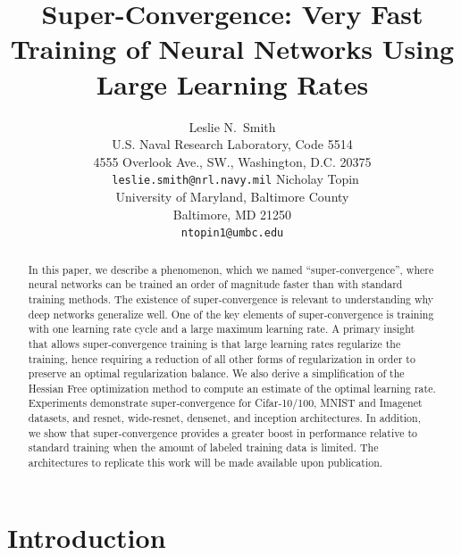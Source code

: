 \documentclass{article}
\title{Super-Convergence: Very Fast Training of Neural Networks Using Large Learning Rates}
\author{Leslie N.~Smith \\
	U.S. Naval Research Laboratory, Code 5514\\
	4555 Overlook Ave., SW., Washington, D.C.  20375\\
	\texttt{ leslie.smith@nrl.navy.mil}
	\And
	Nicholay Topin \\
	University of Maryland, Baltimore County \\
	Baltimore, MD 21250 \\
	\texttt{ntopin1@umbc.edu} \\
}
\begin{document}

\maketitle

\begin{abstract}
In this paper, we describe a phenomenon, which we named ``super-convergence'', where neural networks can be trained  an order of magnitude faster than with standard training methods. 
The existence of super-convergence is relevant to understanding why deep networks generalize well.
One of the key elements of super-convergence is training with one learning rate cycle and a large maximum learning rate.
A primary insight that allows super-convergence training is that large learning rates regularize the training, hence requiring a reduction of all other forms of regularization in order to preserve an optimal regularization balance.
We also derive a simplification of the Hessian Free optimization method to compute an estimate of the optimal learning rate.
Experiments demonstrate super-convergence for Cifar-10/100, MNIST and Imagenet datasets, and resnet, wide-resnet, densenet, and inception architectures.
In addition, we show that super-convergence provides a  greater boost in performance relative to standard training when the amount of labeled training data is limited.
The architectures to replicate this work will be made available upon publication.
\end{abstract}

	\section{Introduction}
\end{document}
